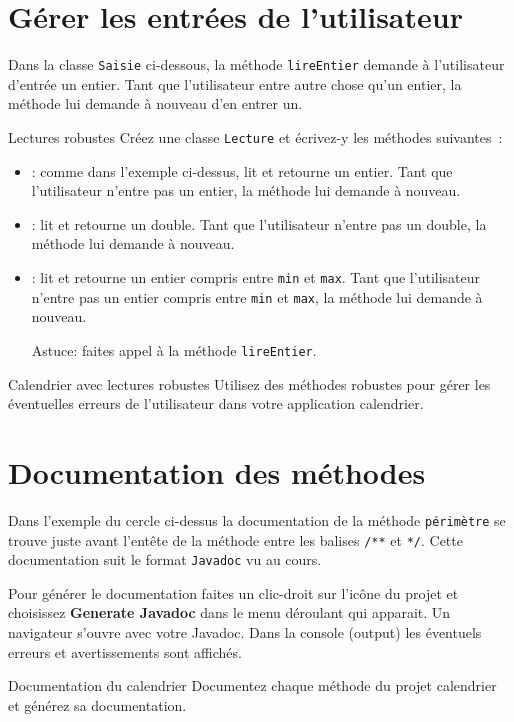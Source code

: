 \documentclass[a4paper,11pt]{article}
\begin{document}
\section{Gérer les entrées de l'utilisateur}

	Dans la classe \texttt{Saisie} ci-dessous, la méthode \texttt{lireEntier} demande à l'utilisateur d'entrée un entier.
	Tant que l'utilisateur entre autre chose qu'un entier, la méthode lui demande à nouveau d'en entrer un. 
	

	
	
	\begin{Exercice}{Lectures robustes}
		Créez une classe \texttt{Lecture} et écrivez-y les méthodes suivantes~:
		\begin{itemize}
			\item {}: comme dans l'exemple ci-dessus, lit et retourne un entier.
				Tant que l'utilisateur n'entre pas un entier, la méthode lui demande à nouveau.
			\item {}: lit et retourne un double.
				Tant que l'utilisateur n'entre pas un double, la méthode lui demande à nouveau.
			\item {}: lit et retourne un entier 
				compris entre \texttt{min} et \texttt{max}.
				Tant que l'utilisateur n'entre pas un entier compris entre \texttt{min} et \texttt{max}, 
				la méthode lui demande à nouveau.
				
				Astuce: faites appel à la méthode \texttt{lireEntier}.
		\end{itemize}
	\end{Exercice}
	
	\begin{Exercice}{Calendrier avec lectures robustes}
		Utilisez des méthodes robustes pour gérer les éventuelles erreurs de l'utilisateur dans votre application calendrier.
	\end{Exercice}


\section{Documentation des méthodes}

	Dans l'exemple du cercle ci-dessus la documentation de la méthode \texttt{périmètre} 
	se trouve juste avant l'entête de la méthode entre les balises \texttt{/**} et \texttt{*/}.
	Cette documentation suit le format \texttt{Javadoc} vu au cours.
	
	Pour générer le documentation faites un clic-droit sur l'icône du projet et choisissez 
	\textbf{Generate Javadoc} dans le menu déroulant qui apparait. 
	Un navigateur s'ouvre avec votre Javadoc. Dans la console (output) les éventuels 
	erreurs et avertissements sont affichés.

	\begin{Exercice}{Documentation du calendrier}
		Documentez chaque méthode du projet calendrier et générez sa documentation.
	\end{Exercice}

	
				
\end{document}
